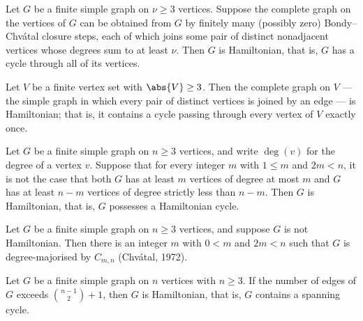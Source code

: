 \begin{theorem}
\label{SimpleGraph.hamiltonian_of_closureSteps_top}
Let $G$ be a finite simple graph on $\nu \ge 3$ vertices. Suppose the complete graph on
the vertices of $G$ can be obtained from $G$ by finitely many (possibly zero)
Bondy--Chv\'atal closure steps, each of which joins some pair of distinct nonadjacent
vertices whose degrees sum to at least $\nu$. Then $G$ is Hamiltonian, that is, $G$ has
a cycle through all of its vertices.
\end{theorem}

\begin{theorem}
\label{SimpleGraph.top_isHamiltonian}
Let $V$ be a finite vertex set with $\abs{V} \ge 3$. Then the complete graph on $V$ —
the simple graph in which every pair of distinct vertices is joined by an edge — is
Hamiltonian; that is, it contains a cycle passing through every vertex of $V$ exactly
once.
\end{theorem}

\begin{theorem}
\label{SimpleGraph.chvatal_hamiltonian}
Let $G$ be a finite simple graph on $n \ge 3$ vertices, and write $\deg(v)$ for the
degree of a vertex $v$. Suppose that for every integer $m$ with $1 \le m$ and $2m < n$,
it is not the case that both $G$ has at least $m$ vertices of degree at most $m$ and $G$
has at least $n - m$ vertices of degree strictly less than $n - m$. Then $G$ is
Hamiltonian, that is, $G$ possesses a Hamiltonian cycle.
\end{theorem}

\begin{theorem}
\label{SimpleGraph.chvatal_degree_majorised}
Let $G$ be a finite simple graph on $n \ge 3$ vertices, and suppose $G$ is not
Hamiltonian. Then there is an integer $m$ with $0 < m$ and $2m < n$ such that $G$ is
degree-majorised by $C_{m,n}$ (Chvátal, 1972).
\end{theorem}

\begin{theorem}
\label{SimpleGraph.ore_bondy_edge_bound}
Let $G$ be a finite simple graph on $n$ vertices with $n \ge 3$. If the number of edges
of $G$ exceeds $\binom{n-1}{2} + 1$, then $G$ is Hamiltonian, that is, $G$ contains a
spanning cycle.
\end{theorem}

